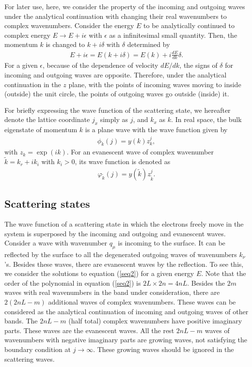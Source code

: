 \documentclass[aps,pra,amsmath,twocolumn,showpacs,bibnotes,10pt]{revtex4-1}
\begin{document}
For later use, here, we consider the property of the incoming and outgoing waves under the analytical continuation with changing their real wavenumbers to complex wavenumbers. Consider the energy $E$ to be analytically continued to complex energy $E \to E + i\epsilon$ with $\epsilon$ as a infinitesimal small quantity. Then, the momentum $k$ is changed to $k+i\delta$ with $\delta$ determined by
\begin{eqnarray}
E+i\epsilon = E(k+i\delta) = E(k)+i\frac{dE}{dk}\delta. \label{eng}
\end{eqnarray}
For a given $\epsilon$, because of the dependence of velocity $dE/dk$, the signs of $\delta$ for incoming and outgoing waves are opposite. Therefore, under the analytical continuation in the $z$ plane, with the points of incoming waves moving to inside (outside) the unit circle, the points of outgoing waves go outside (inside) it.

For briefly expressing the wave function of the scattering state, we hereafter denote the lattice coordinate $j_x$ simply as $j$, and $k_x$ as $k$. In real space, the bulk eigenstate of momentum $k$ is a plane wave with the wave function given by
\begin{eqnarray}
\phi_k(j) =  y(k)z_k^j,  \label{plw}
\end{eqnarray}
with $z_k = \exp(ik)$. For an evanescent wave of complex wavenumber $\tilde k = k_r + ik_i$ with $k_i > 0$, its wave function is denoted as 
\begin{eqnarray}
\varphi_{\tilde k}(j) = y({\tilde k})z_{\tilde k}^j.  \label{evw}
\end{eqnarray}

\subsection{Scattering states} 

The wave function of a scattering state in which the electrons freely move in the system is superposed by the incoming and outgoing and evanescent waves. Consider a wave with wavenumber $q_{\mu}$ is incoming to the surface. It can be reflected by the surface to all the degenerated outgoing waves of wavenumbers $k_{\nu}$'s. Besides these waves, there are evanescent waves by the reflection. To see this, we consider the solutions to equation (\ref{seq2}) for a given energy $E$. Note that the order of the polynomial in equation (\ref{seq2}) is $2L\times 2n = 4nL$. Besides the $2m$ waves with real wavenumbers in the band under consideration, there are $2(2nL-m)$ additional waves of complex wavenumbers. These waves can be considered as the analytical continuation of incoming and outgoing waves of other bands. The $2nL-m$ (half total) complex wavenumbers have positive imaginary parts. These waves are the evanescent waves. All the rest $2nL-m$ waves of wavenumbers with negative imaginary parts are growing waves, not satisfying the boundary condition at $j \to \infty$. These growing waves should be ignored in the scattering waves. 
\end{document}
